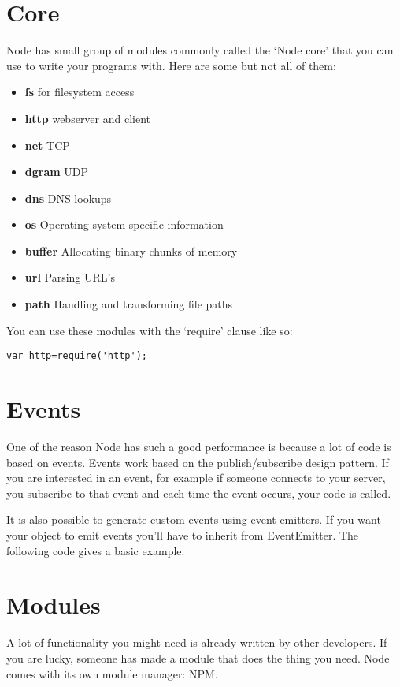 \documentclass[a4paper]{report}
\begin{document}
\section*{Core}
Node has small group of modules commonly called the `Node core' that you can use to write your programs with. Here are some but not all of them:
\begin{itemize}
	\item \textbf{fs} for filesystem access
	\item \textbf{http} webserver and client
	\item \textbf{net} TCP 
	\item \textbf{dgram} UDP
	\item \textbf{dns} DNS lookups
	\item \textbf{os} Operating system specific information
	\item \textbf{buffer} Allocating binary chunks of memory
	\item \textbf{url} Parsing URL's
	\item \textbf{path} Handling and transforming file paths
\end{itemize}

\noindent You can use these modules with the `require' clause like so: 
\begin{lstlisting}
var http=require('http');
\end{lstlisting}

\section*{Events}
One of the reason Node has such a good performance is because a lot of code is based on events. Events work based on the publish/subscribe design pattern. If you are interested in an event, for example if someone connects to your server, you subscribe to that event and each time the event occurs, your code is called.



\noindent It is also possible to generate custom events using event emitters. If you want your object to emit events you'll have to inherit from EventEmitter. The following code gives a basic example.



\section*{Modules}
A lot of functionality you might need is already written by other developers. If you are lucky, someone has made a module that does the thing you need. Node comes with its own module manager: NPM. 
\end{document}
